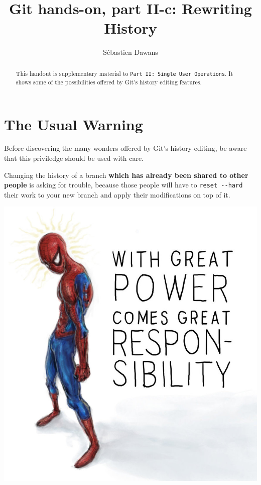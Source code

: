 \documentclass[a4paper]{../../common/tufte-latex/tufte-handout}
\title{Git hands-on, part II-c: Rewriting History}
\author{S\'ebastien Dawans}
\begin{document}
\maketitle%

\tableofcontents

\begin{abstract}
\noindent
This handout is supplementary material to \texttt{Part II: Single User Operations}. It shows some of the possibilities offered by Git's history editing features.
\end{abstract}

\section{The Usual Warning}

Before discovering the many wonders offered by Git's history-editing, be aware that this priviledge should be used with care.

Changing the history of a branch \textbf{which has already been shared to other people} is asking for trouble, because those people will have to \texttt{reset -{}-hard} their work to your new branch and apply their modifications on top of it.

\begin{marginfigure}%
  \centering
  \includegraphics[width=\linewidth]{spiderman.jpg}
  \label{fig:spiderman}
\end{marginfigure}
\end{document}
